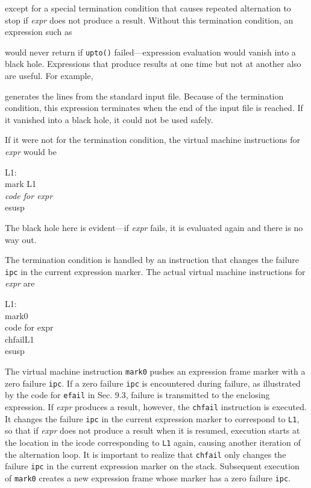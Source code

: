
\noindent except for a special termination condition that causes
repeated alternation to stop if \textit{expr} does not produce a
result. Without this termination condition, an expression such as


\noindent would never return if \texttt{upto()} failed{---}expression
evaluation would vanish into a {\textquotedbl}black
hole.{\textquotedbl} Expressions that produce results at one time but
not at another also are useful. For example,


\noindent generates the lines from the standard input file. Because of
the termination condition, this expression terminates when the end of
the input file is reached. If it vanished into a {\textquotedbl}black
hole,{\textquotedbl} it could not be used safely.

If it were not for the termination condition, the virtual machine
instructions for \texttt{{\textbar}}\textit{expr} would be

\begin{iconcode}
L1:\\
\>\>mark\>\>\>\> L1\\
\>\>\textit{code for expr}\\
\>\>esusp
\end{iconcode}

The {\textquotedbl}black hole{\textquotedbl} here is evident{---}if
\textit{expr} fails, it is evaluated again and there is no way out.

The termination condition is handled by an instruction that changes
the failure \texttt{ipc} in the current expression marker. The actual
virtual machine instructions for \texttt{{\textbar}}\textit{expr} are

\begin{iconcode}
L1:\\
\>\>mark0\\
\>\>code for expr\\
\>\>chfail\>\>\>\>L1\\
\>\>esusp
\end{iconcode}

The virtual machine instruction \texttt{mark0} pushes an expression
frame marker with a zero failure \texttt{ipc}. If a zero failure
\texttt{ipc} is encountered during failure, as illustrated by the code
for \texttt{efail} in Sec. 9.3, failure is transmitted to the
enclosing expression. If \textit{expr }produces a result, however, the
\texttt{chfail} instruction is executed. It changes the failure
\texttt{ipc} in the current expression marker to correspond to
\texttt{L1}, so that if \textit{expr }does not produce a result when
it is resumed, execution starts at the location in the icode
corresponding to \texttt{L1} again, causing another iteration of the
alternation loop. It is important to realize that \texttt{chfail} only
changes the failure \texttt{ipc} in the current expression marker on
the stack.  Subsequent execution of \texttt{mark0} creates a new
expression frame whose marker has a zero failure \texttt{ipc}.

